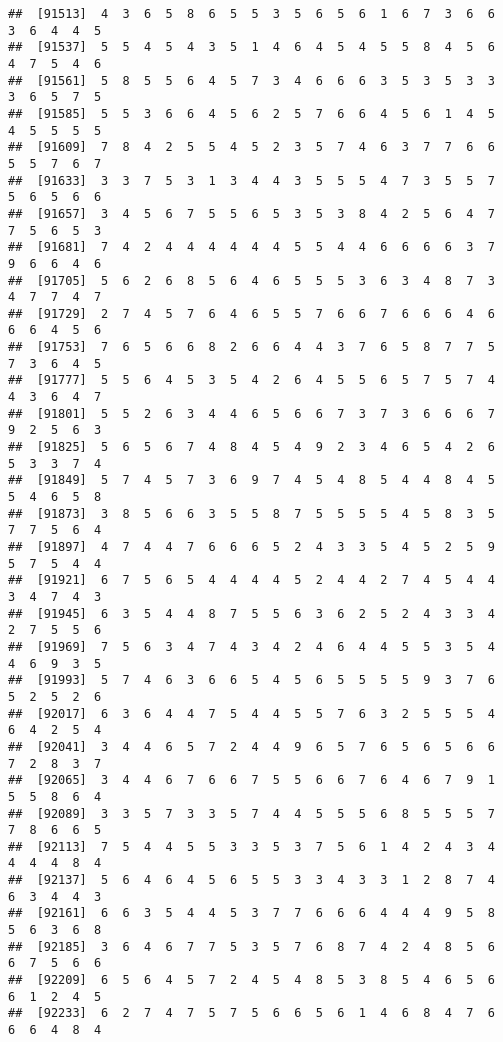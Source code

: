 \documentclass[
]{book}
\begin{document}
\begin{verbatim}
##  [91513]  4  3  6  5  8  6  5  5  3  5  6  5  6  1  6  7  3  6  6  3  6  4  4  5
##  [91537]  5  5  4  5  4  3  5  1  4  6  4  5  4  5  5  8  4  5  6  4  7  5  4  6
##  [91561]  5  8  5  5  6  4  5  7  3  4  6  6  6  3  5  3  5  3  3  3  6  5  7  5
##  [91585]  5  5  3  6  6  4  5  6  2  5  7  6  6  4  5  6  1  4  5  4  5  5  5  5
##  [91609]  7  8  4  2  5  5  4  5  2  3  5  7  4  6  3  7  7  6  6  5  5  7  6  7
##  [91633]  3  3  7  5  3  1  3  4  4  3  5  5  5  4  7  3  5  5  7  5  6  5  6  6
##  [91657]  3  4  5  6  7  5  5  6  5  3  5  3  8  4  2  5  6  4  7  7  5  6  5  3
##  [91681]  7  4  2  4  4  4  4  4  4  5  5  4  4  6  6  6  6  3  7  9  6  6  4  6
##  [91705]  5  6  2  6  8  5  6  4  6  5  5  5  3  6  3  4  8  7  3  4  7  7  4  7
##  [91729]  2  7  4  5  7  6  4  6  5  5  7  6  6  7  6  6  6  4  6  6  6  4  5  6
##  [91753]  7  6  5  6  6  8  2  6  6  4  4  3  7  6  5  8  7  7  5  7  3  6  4  5
##  [91777]  5  5  6  4  5  3  5  4  2  6  4  5  5  6  5  7  5  7  4  4  3  6  4  7
##  [91801]  5  5  2  6  3  4  4  6  5  6  6  7  3  7  3  6  6  6  7  9  2  5  6  3
##  [91825]  5  6  5  6  7  4  8  4  5  4  9  2  3  4  6  5  4  2  6  5  3  3  7  4
##  [91849]  5  7  4  5  7  3  6  9  7  4  5  4  8  5  4  4  8  4  5  5  4  6  5  8
##  [91873]  3  8  5  6  6  3  5  5  8  7  5  5  5  5  4  5  8  3  5  7  7  5  6  4
##  [91897]  4  7  4  4  7  6  6  6  5  2  4  3  3  5  4  5  2  5  9  5  7  5  4  4
##  [91921]  6  7  5  6  5  4  4  4  4  5  2  4  4  2  7  4  5  4  4  3  4  7  4  3
##  [91945]  6  3  5  4  4  8  7  5  5  6  3  6  2  5  2  4  3  3  4  2  7  5  5  6
##  [91969]  7  5  6  3  4  7  4  3  4  2  4  6  4  4  5  5  3  5  4  4  6  9  3  5
##  [91993]  5  7  4  6  3  6  6  5  4  5  6  5  5  5  5  9  3  7  6  5  2  5  2  6
##  [92017]  6  3  6  4  4  7  5  4  4  5  5  7  6  3  2  5  5  5  4  6  4  2  5  4
##  [92041]  3  4  4  6  5  7  2  4  4  9  6  5  7  6  5  6  5  6  6  7  2  8  3  7
##  [92065]  3  4  4  6  7  6  6  7  5  5  6  6  7  6  4  6  7  9  1  5  5  8  6  4
##  [92089]  3  3  5  7  3  3  5  7  4  4  5  5  5  6  8  5  5  5  7  7  8  6  6  5
##  [92113]  7  5  4  4  5  5  3  3  5  3  7  5  6  1  4  2  4  3  4  4  4  4  8  4
##  [92137]  5  6  4  6  4  5  6  5  5  3  3  4  3  3  1  2  8  7  4  6  3  4  4  3
##  [92161]  6  6  3  5  4  4  5  3  7  7  6  6  6  4  4  4  9  5  8  5  6  3  6  8
##  [92185]  3  6  4  6  7  7  5  3  5  7  6  8  7  4  2  4  8  5  6  6  7  5  6  6
##  [92209]  6  5  6  4  5  7  2  4  5  4  8  5  3  8  5  4  6  5  6  6  1  2  4  5
##  [92233]  6  2  7  4  7  5  7  5  6  6  5  6  1  4  6  8  4  7  6  6  6  4  8  4

\end{verbatim}
\end{document}
